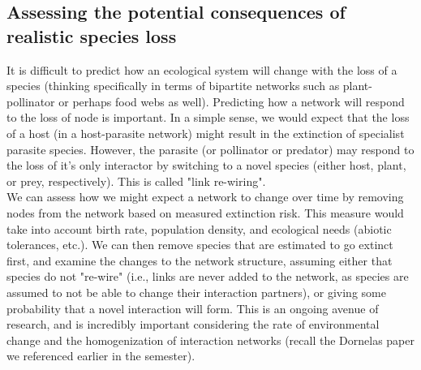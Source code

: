 \documentclass[12pt]{article}
\begin{document}
\subsection*{Assessing the potential consequences of realistic species loss}

It is difficult to predict how an ecological system will change with the loss of a species (thinking specifically in terms of bipartite networks such as plant-pollinator or perhaps food webs as well). Predicting how a network will respond to the loss of node is important. In a simple sense, we would expect that the loss of a host (in a host-parasite network) might result in the extinction of specialist parasite species. However, the parasite (or pollinator or predator) may respond to the loss of it's only interactor by switching to a novel species (either host, plant, or prey, respectively). This is called "link re-wiring". \\

We can assess how we might expect a network to change over time by removing nodes from the network based on measured extinction risk. This measure would take into account birth rate, population density, and ecological needs (abiotic tolerances, etc.). We can then remove species that are estimated to go extinct first, and examine the changes to the network structure, assuming either that species do not "re-wire" (i.e., links are never added to the network, as species are assumed to not be able to change their interaction partners), or giving some probability that a novel interaction will form. This is an ongoing avenue of research, and is incredibly important considering the rate of environmental change and the homogenization of interaction networks (recall the Dornelas paper we referenced earlier in the semester). 
\end{document}
